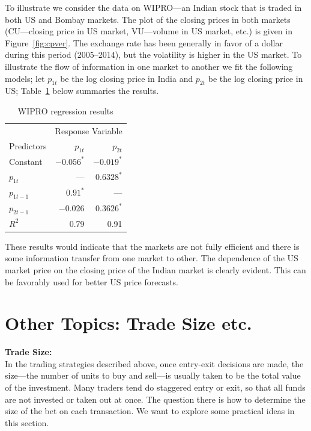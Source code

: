 To illustrate we consider the data on WIPRO---an Indian stock that is traded in both US and Bombay markets. The plot of the closing prices in both markets (CU---closing price in US market, VU---volume in US market, etc.) is given in Figure~\ref{fig:cpver}. The exchange rate has been generally in favor of a dollar during this period (2005--2014), but the volatility is higher in the US market. To illustrate the flow of information in one market to another we fit the following models; let $p_{1t}$ be the log closing price in India and $p_{2t}$ be the log closing price in US; Table~\ref{tab:regresul} below summaries the results.
	\begin{table}[!ht] 
	\centering
	\caption{WIPRO regression results \label{tab:regresul}}
	\begin{tabular}{l | rr} 
	& \multicolumn{2}{c}{Response Variable} \\ 
	Predictors & $p_{1t}$ & $p_{2t}$ \\ \hline 
	Constant & $-0.056^*$ & $-0.019^*$ \\
	$p_{1t}$ & ---  & $0.6328^*$ \\
	$p_{1t-1}$ & $0.91^*$ & --- \\
	$p_{2t-1}$ & $-0.026$ & $0.3626^*$ \\ \hline
	$R^2$ & 0.79 & 0.91 
	\end{tabular}
	\end{table}
These results would indicate that the markets are not fully efficient and there is some information transfer from one market to other. The dependence of the US market price on the closing price of the Indian market is clearly evident. This can be favorably used for better US price forecasts. 



\section{Other Topics: Trade Size etc.}

\noindent \textbf{Trade Size:} \\

In the trading strategies described above, once entry-exit decisions are made, the size---the number of units to buy and sell---is usually taken to be the total value of the investment. Many traders tend do staggered entry or exit, so that all funds are not invested or taken out at once. The question there is how to determine the size of the bet on each transaction. We want to explore some practical ideas in this section. 


